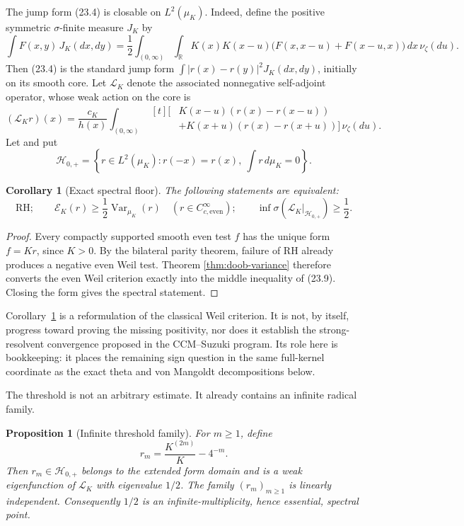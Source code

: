 \documentclass[11pt]{amsart}
\newtheorem{proposition}[theorem]{Proposition}
\newtheorem{corollary}[theorem]{Corollary}
\theoremstyle{definition}
\theoremstyle{remark}
\begin{document}
The jump form (23.4) is closable on \(L^2(\mu_K)\).  Indeed, define the
positive symmetric \(\sigma\)-finite measure \(J_K\) by
\[
 \int F(x,y)\,J_K(dx,dy)
 =\frac12\int_{(0,\infty)}\!\int_\mathbb R
 K(x)K(x-u)
 \bigl(F(x,x-u)+F(x-u,x)\bigr)\,dx\,\nu_\zeta(du).
\tag{23.7a}
\]
Then (23.4) is the standard jump form
\(\int|r(x)-r(y)|^2J_K(dx,dy)\), initially on its smooth core.
Let
\(\mathcal L_K\) denote the associated nonnegative self-adjoint operator,
whose weak action on the core is
\[
 (\mathcal L_Kr)(x)
 =\frac{c_K}{h(x)}
 \int_{(0,\infty)}
 \begin{aligned}[t]
 \bigl[&K(x-u)(r(x)-r(x-u))\\
       &+K(x+u)(r(x)-r(x+u))\bigr]\,\nu_\zeta(du).
 \end{aligned}
\tag{23.7b}
\]
Let
and put
\[
 \mathcal H_{0,+}
 =\left\{r\in L^2(\mu_K):
 r(-x)=r(x),\ \int r\,d\mu_K=0\right\}.
\tag{23.8}
\]

\begin{corollary}[Exact spectral floor]
\label{cor:exact-spectral-floor}
The following statements are equivalent:
\[
 \mathrm{RH};
 \qquad
 \mathscr E_K(r)\ge\frac12\operatorname{Var}_{\mu_K}(r)
 \quad(r\in C_{c,\mathrm{even}}^\infty);
 \qquad
 \inf\sigma(\mathcal L_K|_{\mathcal H_{0,+}})\ge\frac12.
\tag{23.9}
\]
\end{corollary}

\begin{proof}
Every compactly supported smooth even test \(f\) has the unique form
\(f=Kr\), since \(K>0\).  By the bilateral parity theorem, failure of
RH already produces a negative even Weil test.  Theorem
\ref{thm:doob-variance} therefore converts the even Weil criterion exactly
into the middle inequality of (23.9).  Closing the form gives the spectral
statement.
\end{proof}

Corollary~\ref{cor:exact-spectral-floor} is a reformulation of the classical
Weil criterion.  It is not, by itself, progress toward proving the missing
positivity, nor does it establish the strong-resolvent convergence proposed
in the CCM--Suzuki program.  Its role here is bookkeeping: it places the
remaining sign question in the same full-kernel coordinate as the exact
theta and von Mangoldt decompositions below.

The threshold is not an arbitrary estimate.  It already contains an
infinite radical family.

\begin{proposition}[Infinite threshold family]
\label{prop:threshold-family}
For \(m\ge1\), define
\[
 r_m=\frac{K^{(2m)}}K-4^{-m}.
\tag{23.10}
\]
Then \(r_m\in\mathcal H_{0,+}\) belongs to the extended form domain and
is a weak eigenfunction of \(\mathcal L_K\) with eigenvalue \(1/2\).
The family \((r_m)_{m\ge1}\) is linearly independent.  Consequently
\(1/2\) is an infinite-multiplicity, hence essential, spectral point.
\end{proposition}
\end{document}
